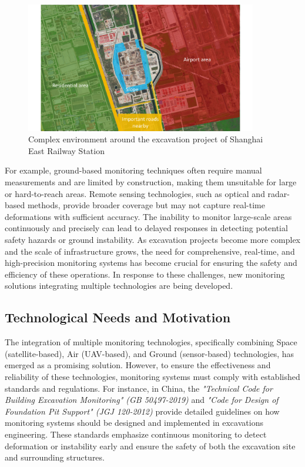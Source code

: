 \documentclass[preprint,11pt,authoryear,3p]{elsarticle}
\begin{document}
\begin{figure}
    \centering
    \includegraphics[width=0.9\textwidth]{imgs/Multi_chars.pdf}
    \caption{Complex environment around the excavation project of Shanghai East Railway Station}
    \label{fig:complexEnvironment}
\end{figure}

For example, ground-based monitoring techniques often require manual measurements and are limited by construction, making them unsuitable for large or hard-to-reach areas. Remote sensing technologies, such as optical and radar-based methods, provide broader coverage but may not capture real-time deformations with sufficient accuracy. The inability to monitor large-scale areas continuously and precisely can lead to delayed responses in detecting potential safety hazards or ground instability.
As excavation projects become more complex and the scale of infrastructure grows, the need for comprehensive, real-time, and high-precision monitoring systems has become crucial for ensuring the safety and efficiency of these operations. In response to these challenges, new monitoring solutions integrating multiple technologies are being developed.

\subsection{Technological Needs and Motivation}

The integration of multiple monitoring technologies, specifically combining Space (satellite-based), Air (UAV-based), and Ground (sensor-based) technologies, has emerged as a promising solution. However, to ensure the effectiveness and reliability of these technologies, monitoring systems must comply with established standards and regulations. For instance, in China, the \textit{"Technical Code for Building Excavation Monitoring" (GB 50497-2019)} and \textit{"Code for Design of Foundation Pit Support" (JGJ 120-2012)} provide detailed guidelines on how monitoring systems should be designed and implemented in excavations engineering. These standards emphasize continuous monitoring to detect deformation or instability early and ensure the safety of both the excavation site and surrounding structures.
\end{document}
